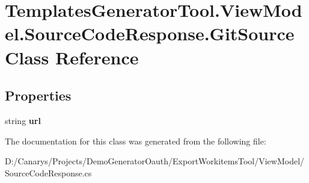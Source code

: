 \hypertarget{class_templates_generator_tool_1_1_view_model_1_1_source_code_response_1_1_git_source}{}\section{Templates\+Generator\+Tool.\+View\+Model.\+Source\+Code\+Response.\+Git\+Source Class Reference}
\label{class_templates_generator_tool_1_1_view_model_1_1_source_code_response_1_1_git_source}
\subsection*{Properties}
\begin{DoxyCompactItemize}
\item 
\mbox{\label{class_templates_generator_tool_1_1_view_model_1_1_source_code_response_1_1_git_source_ab5c23de77706b0d87f683f6f82787467}} 
string {\bfseries url}
\end{DoxyCompactItemize}


The documentation for this class was generated from the following file\+:\begin{DoxyCompactItemize}
\item 
D\+:/\+Canarys/\+Projects/\+Demo\+Generator\+Oauth/\+Export\+Workitems\+Tool/\+View\+Model/Source\+Code\+Response.\+cs\end{DoxyCompactItemize}
